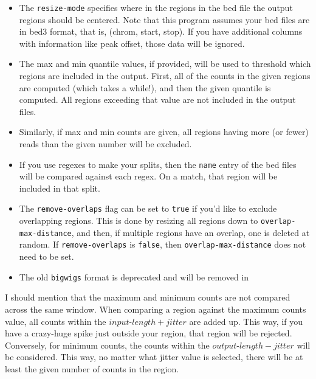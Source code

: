 \documentclass{article}
\begin{document}
\begin{itemize}
    \item The \texttt{resize-mode} specifies where in the regions in the bed
        file the output regions should be centered.
        Note that this program assumes your bed files are in bed3 format, that
        is, (chrom, start, stop).
        If you have additional columns with information like peak offset, those
        data will be ignored.
    \item The max and min quantile values, if provided, will be used to
        threshold which regions are included in the output.
        First, all of the counts in the given regions are computed (which takes
        a while!), and then the given quantile is computed.
        All regions exceeding that value are not included in the output files.
    \item Similarly, if max and min counts are given, all regions having more
        (or fewer) reads than the given number will be excluded.
    \item If you use regexes to make your splits, then the \texttt{name} entry
        of the bed files will be compared against each regex.
        On a match, that region will be included in that split.
    \item The \texttt{remove-overlaps} flag can be set to \texttt{true} if you'd
        like to exclude overlapping regions.
        This is done by resizing all regions down to
        \texttt{overlap-max-distance}, and then, if multiple regions have an
        overlap, one is deleted at random.
        If \texttt{remove-overlaps} is \texttt{false}, then
        \texttt{overlap-max-distance} does not need to be set.
    \item The old \texttt{bigwigs} format is deprecated and will be removed
        in \label{dep:oldbigwigs}
\end{itemize}

I should mention that the maximum and minimum counts are not compared across the
same window.
When comparing a region against the maximum counts value, all counts within the
$input\mbox{-}length + jitter$ are added up.
This way, if you have a crazy-huge spike just outside your region, that region
will be rejected.
Conversely, for minimum counts, the counts within the
$output\mbox{-}length - jitter$ will be considered.
This way, no matter what jitter value is selected, there will be at least the
given number of counts in the region.


\newpage
\end{document}
